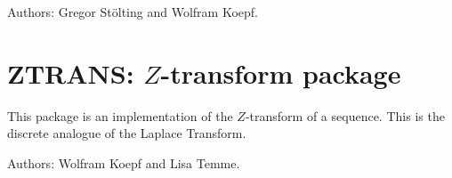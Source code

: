 Authors: Gregor St\"olting and Wolfram Koepf.

\section{ZTRANS: \texorpdfstring{$Z$}{\textit{Z}}-transform package}

This package is an implementation of the $Z$-transform of a sequence.
This is the discrete analogue of the Laplace Transform.

Authors: Wolfram Koepf and Lisa Temme.

\let\sectionmark=\origsectionmark
